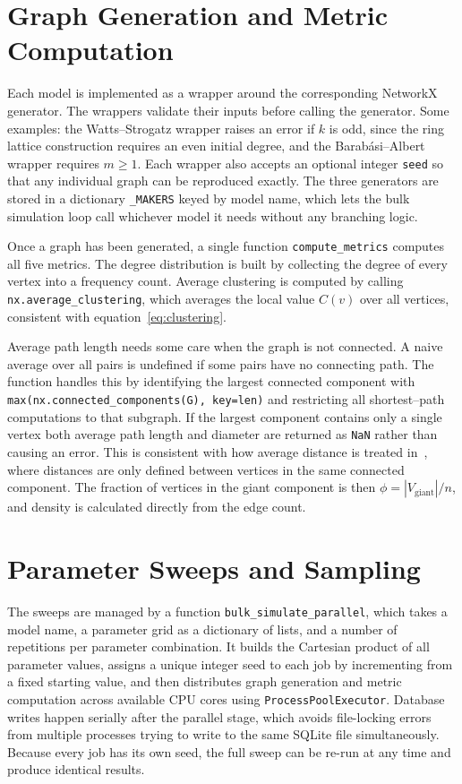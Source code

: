 \documentclass[12pt, a4paper]{report}
\theoremstyle{definition}
\theoremstyle{plain}
\theoremstyle{remark}
\begin{document}
\section{Graph Generation and Metric Computation}
\label{sec:graph_gen_metrics}

Each model is implemented as a wrapper around the corresponding NetworkX
generator. The wrappers validate their inputs before calling the
generator. Some examples: the Watts--Strogatz wrapper raises an error
if $k$ is odd, since the ring lattice construction requires an even
initial degree, and the Barab\'asi--Albert wrapper requires $m \ge 1$.
Each wrapper also accepts an optional integer \texttt{seed} so that any
individual graph can be reproduced exactly. The three generators are
stored in a dictionary \texttt{\_MAKERS} keyed by model name, which
lets the bulk simulation loop call whichever model it needs without any
branching logic.

Once a graph has been generated, a single function
\texttt{compute\_metrics} computes all five metrics. The degree
distribution is built by collecting the degree of every vertex into a
frequency count. Average clustering is computed by calling
\texttt{nx.average\_clustering}, which averages the local value
$C(v)$ over all vertices, consistent with equation~\eqref{eq:clustering}.

Average path length needs some care when the graph is not connected.
A naive average over all pairs is undefined if some pairs have no
connecting path. The function handles this by identifying the largest
connected component with
\texttt{max(nx.connected\_components(G),~key=len)} and restricting
all shortest--path computations to that subgraph. If the largest
component contains only a single vertex both average path length and
diameter are returned as \texttt{NaN} rather than causing an error.
This is consistent with how average distance is treated in~\cite{hofstad2017},
where distances are only defined between vertices
in the same connected component. The fraction of vertices in the giant
component is then $\phi = |V_{\text{giant}}|/n$, and density is
calculated directly from the edge count.

\section{Parameter Sweeps and Sampling}
\label{sec:param_sweep}

The sweeps are managed by a function \texttt{bulk\_simulate\_parallel},
which takes a model name, a parameter grid as a dictionary of lists, and
a number of repetitions per parameter combination. It builds the
Cartesian product of all parameter values, assigns a unique integer seed
to each job by incrementing from a fixed starting value, and then
distributes graph generation and metric computation across available CPU
cores using \texttt{ProcessPoolExecutor}. Database writes happen
serially after the parallel stage, which avoids file-locking errors
from multiple processes trying to write to the same SQLite file
simultaneously. Because every job has its own seed, the full sweep can
be re-run at any time and produce identical results.
\end{document}
